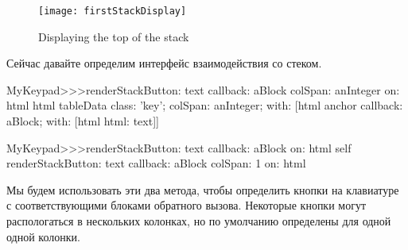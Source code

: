 \documentclass[a4paper,10pt,twoside]{book}
\begin{document}
\begin{figure}[ht]
\begin{center}
\texttt{[image: firstStackDisplay]}
\caption{Displaying the top of the stack}
\end{center}
\end{figure}


Сейчас давайте определим интерфейс взаимодействия со стеком.



\begin{code}{}
MyKeypad>>>renderStackButton: text callback: aBlock colSpan: anInteger on: html 
	html tableData
		class: 'key';
		colSpan: anInteger;
		with: 
				[html anchor
					callback: aBlock;
					with: [html html: text]]
\end{code}


\begin{code}{}
MyKeypad>>>renderStackButton: text callback: aBlock on: html 
	self 
		renderStackButton: text
		callback: aBlock
		colSpan: 1
		on: html
\end{code}


Мы будем использовать эти два метода, чтобы определить кнопки на
клавиатуре с соответствующими блоками обратного вызова.
Некоторые кнопки могут распологаться в нескольких колонках, но по
умолчанию определены для одной одной колонки.


\end{document}
